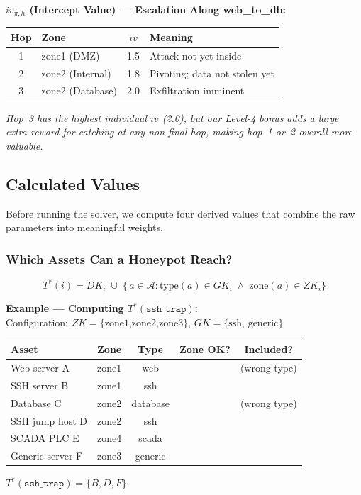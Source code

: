 \documentclass[journal]{IEEEtran}
\newcommand{\cmark}{\textcolor{novelgreen}{\ding{51}}}
\newcommand{\xmark}{\textcolor{novelred}{\ding{55}}}
\newcommand{\calA}{\mathcal{A}}
\begin{document}
\begin{examplebox}
\textbf{$iv_{\pi,h}$ (Intercept Value) ---
Escalation Along web\_to\_db:}
\begin{center}
\small
\renewcommand{\arraystretch}{1.1}
\begin{tabular}{@{}clcl@{}}
\toprule
\textbf{Hop} & \textbf{Zone} & $iv$ & \textbf{Meaning} \\
\midrule
1 & zone1 (DMZ)      & 1.5 & Attack not yet inside \\
2 & zone2 (Internal) & 1.8 & Pivoting; data not stolen yet \\
3 & zone2 (Database) & 2.0 & Exfiltration imminent \\
\bottomrule
\end{tabular}
\end{center}
\textit{Hop~3 has the highest individual $iv$ (2.0), but our
Level-4 bonus adds a large extra reward for catching at any
\emph{non-final} hop, making hop~1 or~2 overall more
valuable.}
\end{examplebox}

\subsection{Calculated Values}

Before running the solver, we compute four derived values
that combine the raw parameters into meaningful weights.

\subsubsection{Which Assets Can a Honeypot Reach?}
\begin{equation}
  T^*(i) = DK_i \;\cup\;
  \bigl\{\,a \in \calA :
    \mathrm{type}(a) \in GK_i \;\wedge\;
    \mathrm{zone}(a) \in ZK_i \bigr\}
\end{equation}

\begin{examplebox}
\textbf{Example --- Computing $T^*(\texttt{ssh\_trap})$:}\\[3pt]
Configuration: $ZK=\{\text{zone1,zone2,zone3}\}$,
$GK=\{\text{ssh, generic}\}$
\begin{center}
\small
\renewcommand{\arraystretch}{1.1}
\begin{tabular}{@{}llccc@{}}
\toprule
\textbf{Asset} & \textbf{Zone} & \textbf{Type} &
\textbf{Zone OK?} & \textbf{Included?} \\
\midrule
Web server A    & zone1 & web    & \cmark & \xmark (wrong type) \\
SSH server B    & zone1 & ssh    & \cmark & \cmark \\
Database C      & zone2 & database& \cmark & \xmark (wrong type) \\
SSH jump host D & zone2 & ssh    & \cmark & \cmark \\
SCADA PLC E     & zone4 & scada  & \xmark & \xmark \\
Generic server F& zone3 & generic& \cmark & \cmark \\
\bottomrule
\end{tabular}
\end{center}
$T^*(\texttt{ssh\_trap}) = \{B, D, F\}$.
\end{examplebox}
\end{document}
